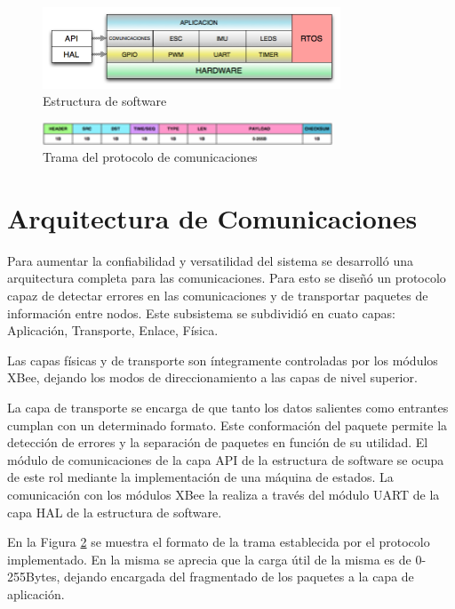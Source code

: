 \documentclass[a4paper, conference]{IEEEtran}
\begin{document}
\begin{figure}[!t]
\centering
\includegraphics[width=3.49in]{soft}
\caption{Estructura de software}
\label{ref:soft}
\end{figure}

\begin{figure}[!t]
\centering
\includegraphics[width=3.40in]{trama}
\caption{Trama del protocolo de comunicaciones}
\label{ref:trama}
\end{figure}

\section{Arquitectura de Comunicaciones}

Para aumentar la confiabilidad y versatilidad del sistema se desarrolló una arquitectura completa para las comunicaciones. Para esto se diseñó un protocolo capaz de detectar errores en las comunicaciones y de transportar paquetes de información entre nodos. Este subsistema se subdividió en cuato capas: Aplicación, Transporte, Enlace, Física.

Las capas físicas y de transporte son íntegramente controladas por los módulos XBee, dejando los modos de direccionamiento a las capas de nivel superior.

La capa de transporte se encarga de que tanto los datos salientes como entrantes cumplan con un determinado formato. Este conformación del paquete permite la detección de errores y la separación de paquetes en función de su utilidad. El módulo de comunicaciones de la capa API de la estructura de software se ocupa de este rol mediante la implementación de una máquina de estados. La comunicación con los módulos XBee la realiza a través del módulo UART de la capa HAL de la estructura de software. 

En la Figura \ref{ref:trama} se muestra el formato de la trama establecida por el protocolo implementado. En la misma se aprecia que la carga útil de la misma es de 0-255Bytes, dejando encargada del fragmentado de los paquetes a la capa de aplicación.
 
\end{document}
